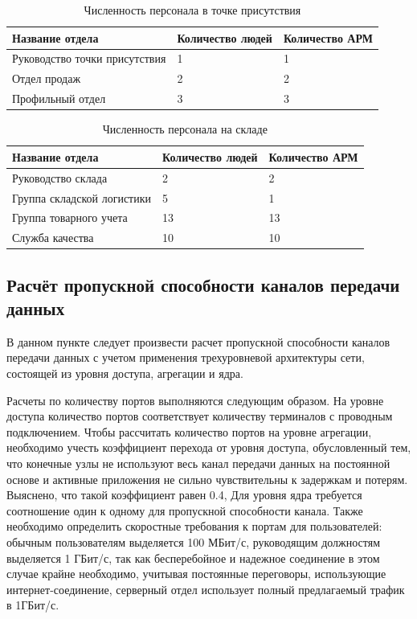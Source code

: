 \documentclass[14pt, a4paper]{extarticle}
\numberwithin{equation}{section}
\begin{document}
\begin{table}[H]
\centering
\small
\caption{Численность персонала в точке присутствия}
\begin{tabular}{|m{5cm}|m{3cm}|m{3cm}|}
\hline
\textbf{Название отдела} & \textbf{Количество людей} & \textbf{Количество АРМ} \\
\hline
Руководство точки присутствия & 1 & 1 \\
\hline
Отдел продаж & 2 & 2 \\
\hline
Профильный отдел & 3 & 3 \\
\hline
\end{tabular}
\label{table:tpPopul}
\end{table}


\begin{table}[H]
\centering
\small
\caption{Численность персонала на складе}
\begin{tabular}{|m{4cm}|m{3cm}|m{3cm}|}
\hline
\textbf{Название отдела} & \textbf{Количество людей} & \textbf{Количество АРМ} \\
\hline
Руководство склада & 2 & 2 \\
\hline
Группа складской логистики & 5 & 1 \\
\hline
Группа товарного учета & 13 & 13 \\
\hline
Служба качества & 10 & 10 \\
\hline
\end{tabular}
\label{table:warehousePopul}
\end{table}


\subsection{Расчёт пропускной способности каналов передачи данных}
В данном пункте следует произвести расчет пропускной способности каналов передачи 
данных с учетом применения трехуровневой архитектуры сети, состоящей 
из уровня доступа, агрегации и ядра. 

Расчеты по количеству портов выполняются следующим образом.
На уровне доступа количество портов соответствует количеству терминалов 
с проводным подключением. 
Чтобы рассчитать количество портов на уровне агрегации, необходимо 
учесть коэффициент перехода от уровня доступа, обусловленный тем, 
что конечные узлы не используют весь канал передачи данных на 
постоянной основе и активные приложения не сильно 
чувствительны к задержкам и потерям. Выяснено, что такой коэффициент равен 0.4,
Для уровня ядра требуется соотношение один к одному для пропускной способности канала.
Также необходимо определить скоростные требования
к портам для пользователей: обычным пользователям выделяется 
100 МБит/с, руководящим должностям выделяется 1 ГБит/с, так как 
бесперебойное и надежное соединение в 
этом случае крайне необходимо, учитывая постоянные 
переговоры, использующие интернет-соединение, серверный отдел 
использует полный предлагаемый трафик в 1ГБит/с. 
\end{document}
